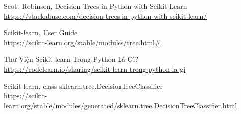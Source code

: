 \renewcommand\bibname{TÀI LIỆU THAM KHẢO}

\begin{thebibliography}{}

Scott Robinson, Decision Trees in Python with Scikit-Learn
\\\url{https://stackabuse.com/decision-trees-in-python-with-scikit-learn/}

Scikit-learn, User Guide
\\\url{https://scikit-learn.org/stable/modules/tree.html#}

Thư Viện Scikit-learn Trong Python Là Gì?
\\\url{https://codelearn.io/sharing/scikit-learn-trong-python-la-gi}

Scikit-learn, class sklearn.tree.DecisionTreeClassifier
\\\url{https://scikit-learn.org/stable/modules/generated/sklearn.tree.DecisionTreeClassifier.html}

\end{thebibliography}